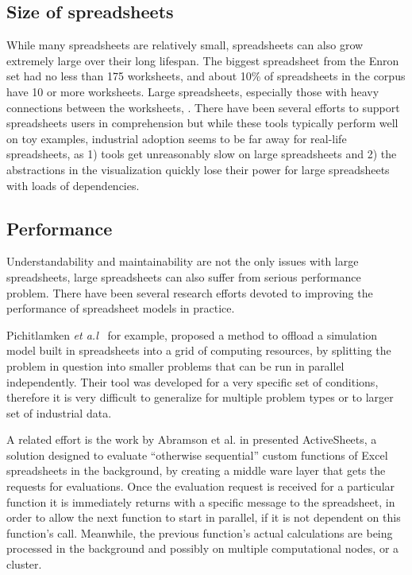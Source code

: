 \documentclass[conference]{IEEEtran}
\begin{document}
\subsection{Size of spreadsheets}
While many spreadsheets are relatively small, spreadsheets can also grow extremely large over their long lifespan. The biggest spreadsheet from the Enron set had no less than 175 worksheets, and about 10\% of spreadsheets in the corpus have 10 or more worksheets. Large spreadsheets, especially those with heavy connections between the worksheets, . There have been several efforts to support spreadsheets users in comprehension  but while these tools typically perform well on toy examples, industrial adoption seems to be far away for real-life spreadsheets, as 1) tools get unreasonably slow on large spreadsheets and 2) the abstractions in the visualization quickly lose their power for large spreadsheets with loads of dependencies. 


\subsection{Performance}
Understandability and maintainability are not the only issues with large spreadsheets, large spreadsheets can also suffer from serious performance problem. There have been several research efforts devoted to improving the performance of spreadsheet models in practice.

Pichitlamken \emph{et a.l}~\cite{7_pichitlamken_kajkamhaeng_uthayopas_kaewpuang_2010} for example, proposed a method to offload a simulation model built in spreadsheets into a grid of computing resources, by splitting the problem in question into smaller problems that can be run in parallel independently. Their tool was developed for a very specific set of conditions, therefore it is very difficult to generalize for multiple problem types or to larger set of industrial data. 

A related effort is the work by Abramson et al. in \cite{6_abramson_roe_kotler_mather_2001} presented ActiveSheets, a solution designed to evaluate “otherwise sequential” custom functions of Excel spreadsheets in the background, by creating a middle ware layer that gets the requests for evaluations. Once the evaluation request is received for a particular function it is immediately returns with a specific message to the spreadsheet, in order to allow the next function to start in parallel, if it is not dependent on this function's call. Meanwhile, the previous function's actual calculations are being processed in the background and possibly on multiple computational nodes, or a cluster. 
\end{document}
